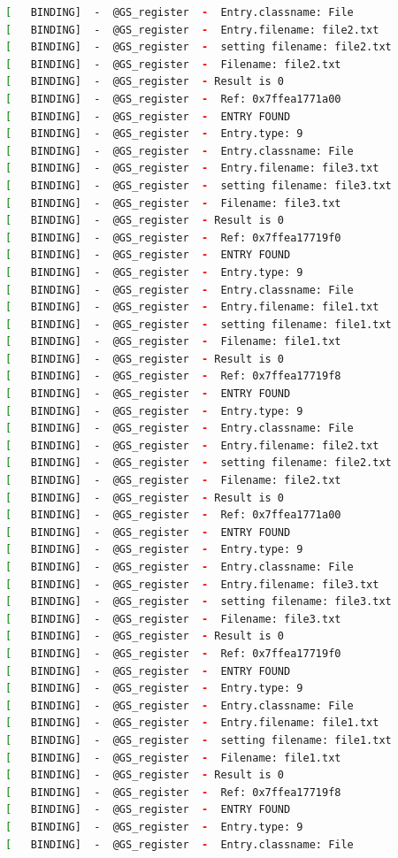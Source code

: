 \begin{lstlisting}[language=bash]
[   BINDING]  -  @GS_register  -  Entry.classname: File
[   BINDING]  -  @GS_register  -  Entry.filename: file2.txt
[   BINDING]  -  @GS_register  -  setting filename: file2.txt
[   BINDING]  -  @GS_register  -  Filename: file2.txt
[   BINDING]  -  @GS_register  - Result is 0
[   BINDING]  -  @GS_register  -  Ref: 0x7ffea1771a00
[   BINDING]  -  @GS_register  -  ENTRY FOUND
[   BINDING]  -  @GS_register  -  Entry.type: 9
[   BINDING]  -  @GS_register  -  Entry.classname: File
[   BINDING]  -  @GS_register  -  Entry.filename: file3.txt
[   BINDING]  -  @GS_register  -  setting filename: file3.txt
[   BINDING]  -  @GS_register  -  Filename: file3.txt
[   BINDING]  -  @GS_register  - Result is 0
[   BINDING]  -  @GS_register  -  Ref: 0x7ffea17719f0
[   BINDING]  -  @GS_register  -  ENTRY FOUND
[   BINDING]  -  @GS_register  -  Entry.type: 9
[   BINDING]  -  @GS_register  -  Entry.classname: File
[   BINDING]  -  @GS_register  -  Entry.filename: file1.txt
[   BINDING]  -  @GS_register  -  setting filename: file1.txt
[   BINDING]  -  @GS_register  -  Filename: file1.txt
[   BINDING]  -  @GS_register  - Result is 0
[   BINDING]  -  @GS_register  -  Ref: 0x7ffea17719f8
[   BINDING]  -  @GS_register  -  ENTRY FOUND
[   BINDING]  -  @GS_register  -  Entry.type: 9
[   BINDING]  -  @GS_register  -  Entry.classname: File
[   BINDING]  -  @GS_register  -  Entry.filename: file2.txt
[   BINDING]  -  @GS_register  -  setting filename: file2.txt
[   BINDING]  -  @GS_register  -  Filename: file2.txt
[   BINDING]  -  @GS_register  - Result is 0
[   BINDING]  -  @GS_register  -  Ref: 0x7ffea1771a00
[   BINDING]  -  @GS_register  -  ENTRY FOUND
[   BINDING]  -  @GS_register  -  Entry.type: 9
[   BINDING]  -  @GS_register  -  Entry.classname: File
[   BINDING]  -  @GS_register  -  Entry.filename: file3.txt
[   BINDING]  -  @GS_register  -  setting filename: file3.txt
[   BINDING]  -  @GS_register  -  Filename: file3.txt
[   BINDING]  -  @GS_register  - Result is 0
[   BINDING]  -  @GS_register  -  Ref: 0x7ffea17719f0
[   BINDING]  -  @GS_register  -  ENTRY FOUND
[   BINDING]  -  @GS_register  -  Entry.type: 9
[   BINDING]  -  @GS_register  -  Entry.classname: File
[   BINDING]  -  @GS_register  -  Entry.filename: file1.txt
[   BINDING]  -  @GS_register  -  setting filename: file1.txt
[   BINDING]  -  @GS_register  -  Filename: file1.txt
[   BINDING]  -  @GS_register  - Result is 0
[   BINDING]  -  @GS_register  -  Ref: 0x7ffea17719f8
[   BINDING]  -  @GS_register  -  ENTRY FOUND
[   BINDING]  -  @GS_register  -  Entry.type: 9
[   BINDING]  -  @GS_register  -  Entry.classname: File

\end{lstlisting}
